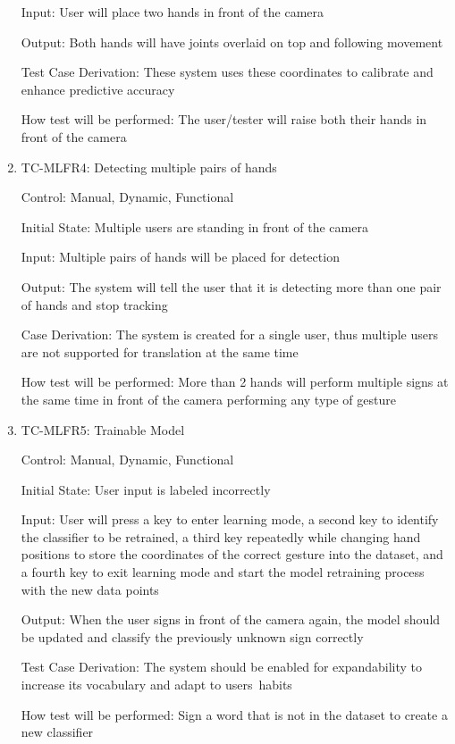 \documentclass[12pt]{article}
\begin{document}
\begin{enumerate}
Input: User will place two hands in front of the camera
              
Output: Both hands will have joints overlaid on top and following movement
    
Test Case Derivation: These system uses these coordinates to calibrate and enhance predictive accuracy
    
How test will be performed: The user/tester will raise both their hands in front of the camera
  
\item{TC-MLFR4: Detecting multiple pairs of hands\\}
  
Control: Manual, Dynamic, Functional
              
Initial State: Multiple users are standing in front of the camera
              
Input: Multiple pairs of hands will be placed for detection
              
Output: The system will tell the user that it is detecting more than one pair of hands and stop tracking
    
   Case Derivation: The system is created for a single user, thus multiple users are not supported for translation at the same time
    
How test will be performed: More than 2 hands will perform multiple signs at the same time in front of the camera performing any type of gesture
  
\item{TC-MLFR5: Trainable Model\\}
  
Control: Manual, Dynamic, Functional
              
Initial State: User input is labeled incorrectly
              
Input: User will press a key to enter learning mode, a second key to identify the classifier to be retrained, a third key repeatedly while changing hand positions to store the coordinates of the correct gesture into the dataset, and a fourth key to exit learning mode and start the model retraining process with the new data points
              
Output: When the user signs in front of the camera again, the model should be updated and classify the previously unknown sign correctly
    
Test Case Derivation: The system should be enabled for expandability to increase its vocabulary and adapt to users\textquotesingle \ habits
    
How test will be performed: Sign a word that is not in the dataset to create a new classifier
  
\end{enumerate}
  
\end{document}
